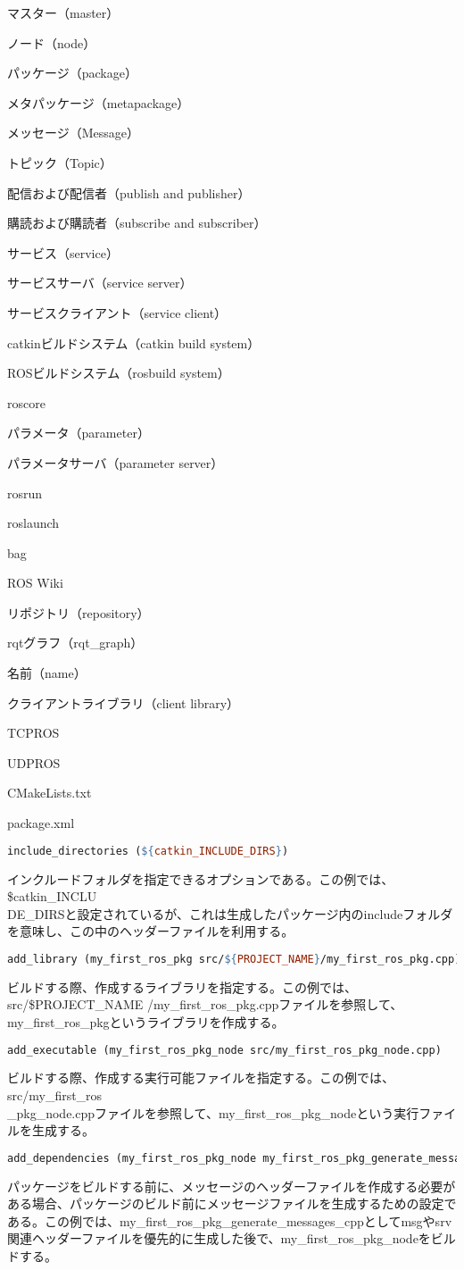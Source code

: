 \begin{term}{マスター（master）}
\begin{term}{ノード（node）}
\begin{term}{パッケージ（package）}
\begin{term}{メタパッケージ（metapackage）}
\begin{term}{メッセージ（Message）}
\begin{term}{トピック（Topic）}
\begin{term}{配信および配信者（publish and publisher）}
\begin{term}{購読および購読者（subscribe and subscriber）}
\begin{term}{サービス（service）}
\begin{term}{サービスサーバ（service server）}
\begin{term}{サービスクライアント（service client）}
\begin{term}{catkinビルドシステム（catkin build system）}
\begin{term}{ROSビルドシステム（rosbuild system）}
\begin{term}{roscore}
\begin{term}{パラメータ（parameter）}
\begin{term}{パラメータサーバ（parameter server）}
\begin{term}{rosrun}
\begin{term}{roslaunch}
\begin{term}{bag}
\begin{term}{ROS Wiki}
\begin{term}{リポジトリ（repository）}
\begin{term}{rqtグラフ（rqt\_graph）}
\begin{term}{名前（name）}
\begin{term}{クライアントライブラリ（client library）}
\begin{term}{TCPROS}
\begin{term}{UDPROS}
\begin{term}{CMakeLists.txt}
\begin{term}{package.xml}
\begin{lstlisting}[language=make]
include_directories (${catkin_INCLUDE_DIRS})
\end{lstlisting}

インクルードフォルダを指定できるオプションである。この例では、\${catkin\_INCLU\\DE\_DIRS}と設定されているが、これは生成したパッケージ内のincludeフォルダを意味し、この中のヘッダーファイルを利用する。

\begin{lstlisting}[language=make]
add_library (my_first_ros_pkg src/${PROJECT_NAME}/my_first_ros_pkg.cpp)
\end{lstlisting}

ビルドする際、作成するライブラリを指定する。この例では、src/\${PROJECT\_NAME} /my\_first\_ros\_pkg.cppファイルを参照して、my\_first\_ros\_pkgというライブラリを作成する。

\begin{lstlisting}[language=make]
add_executable (my_first_ros_pkg_node src/my_first_ros_pkg_node.cpp)
\end{lstlisting}

ビルドする際、作成する実行可能ファイルを指定する。この例では、src/my\_first\_ros\\\_pkg\_node.cppファイルを参照して、my\_first\_ros\_pkg\_nodeという実行ファイルを生成する。

\begin{lstlisting}[language=make]
add_dependencies (my_first_ros_pkg_node my_first_ros_pkg_generate_messages_cpp)
\end{lstlisting}

パッケージをビルドする前に、メッセージのヘッダーファイルを作成する必要がある場合、パッケージのビルド前にメッセージファイルを生成するための設定である。この例では、my\_first\_ros\_pkg\_generate\_messages\_cppとしてmsgやsrv関連ヘッダーファイルを優先的に生成した後で、my\_first\_ros\_pkg\_nodeをビルドする。


\end{term}
\end{term}
\end{term}
\end{term}
\end{term}
\end{term}
\end{term}
\end{term}
\end{term}
\end{term}
\end{term}
\end{term}
\end{term}
\end{term}
\end{term}
\end{term}
\end{term}
\end{term}
\end{term}
\end{term}
\end{term}
\end{term}
\end{term}
\end{term}
\end{term}
\end{term}
\end{term}
\end{term}
